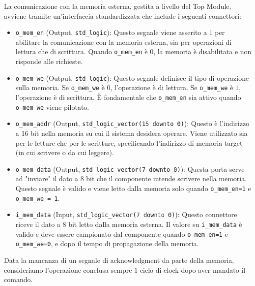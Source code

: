\documentclass{article}
\begin{document}
La comunicazione con la memoria esterna, gestita a livello del Top Module, avviene tramite un'interfaccia standardizzata che include i seguenti connettori:
\begin{itemize}
    
    \item \texttt{o\_mem\_en} (Output, \texttt{std\_logic}): Questo segnale viene asserito a $1$ per abilitare la comunicazione con la memoria esterna, sia per operazioni di lettura che di scrittura. Quando \texttt{o\_mem\_en} è $0$, la memoria è disabilitata e non risponde alle richieste.
    
    \item \texttt{o\_mem\_we} (Output, \texttt{std\_logic}): Questo segnale definisce il tipo di operazione sulla memoria. Se \texttt{o\_mem\_we} è $0$, l'operazione è di lettura. Se \texttt{o\_mem\_we} è $1$, l'operazione è di scrittura. È fondamentale che \texttt{o\_mem\_en} sia attivo quando \texttt{o\_mem\_we} viene pilotato.
    
    \item \texttt{o\_mem\_addr} (Output, \texttt{std\_logic\_vector(15 downto 0)}): Questo è l'indirizzo a 16 bit nella memoria su cui il sistema desidera operare. Viene utilizzato sia per le letture che per le scritture, specificando l'indirizzo di memoria target (in cui scrivere o da cui leggere).
    
    \item \texttt{o\_mem\_data} (Output, \texttt{std\_logic\_vector(7 downto 0)}): Questa porta serve ad "inviare" il dato a 8 bit che il componente intende scrivere nella memoria. Questo segnale è valido e viene letto dalla memoria solo quando \texttt{o\_mem\_en=1} e \texttt{o\_mem\_we = 1}.
    
    \item \texttt{i\_mem\_data} (Input, \texttt{std\_logic\_vector(7 downto 0)}): Questo connettore riceve il dato a 8 bit letto dalla memoria esterna. Il valore su \texttt{i\_mem\_data} è valido e deve essere campionato dal componente quando \texttt{o\_mem\_en=1} e \texttt{o\_mem\_we=0}, e dopo il tempo di propagazione della memoria.
\end{itemize}

\noindent Data la mancanza di un segnale di acknowledgment da parte della memoria, consideriamo l'operazione conclusa sempre $1$ ciclo di clock dopo aver mandato il comando.
\end{document}
